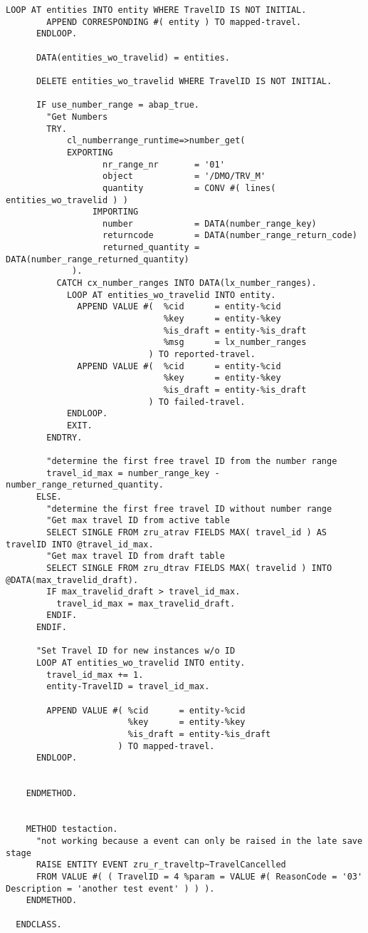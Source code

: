 \begin{Verbatim}[breaklines=true]
      LOOP AT entities INTO entity WHERE TravelID IS NOT INITIAL.
        APPEND CORRESPONDING #( entity ) TO mapped-travel.
      ENDLOOP.
  
      DATA(entities_wo_travelid) = entities.
  
      DELETE entities_wo_travelid WHERE TravelID IS NOT INITIAL.
  
      IF use_number_range = abap_true.
        "Get Numbers
        TRY.
            cl_numberrange_runtime=>number_get(
            EXPORTING
                   nr_range_nr       = '01'
                   object            = '/DMO/TRV_M'
                   quantity          = CONV #( lines( entities_wo_travelid ) )
                 IMPORTING
                   number            = DATA(number_range_key)
                   returncode        = DATA(number_range_return_code)
                   returned_quantity = DATA(number_range_returned_quantity)
             ).
          CATCH cx_number_ranges INTO DATA(lx_number_ranges).
            LOOP AT entities_wo_travelid INTO entity.
              APPEND VALUE #(  %cid      = entity-%cid
                               %key      = entity-%key
                               %is_draft = entity-%is_draft
                               %msg      = lx_number_ranges
                            ) TO reported-travel.
              APPEND VALUE #(  %cid      = entity-%cid
                               %key      = entity-%key
                               %is_draft = entity-%is_draft
                            ) TO failed-travel.
            ENDLOOP.
            EXIT.
        ENDTRY.
  
        "determine the first free travel ID from the number range
        travel_id_max = number_range_key - number_range_returned_quantity.
      ELSE.
        "determine the first free travel ID without number range
        "Get max travel ID from active table
        SELECT SINGLE FROM zru_atrav FIELDS MAX( travel_id ) AS travelID INTO @travel_id_max.
        "Get max travel ID from draft table
        SELECT SINGLE FROM zru_dtrav FIELDS MAX( travelid ) INTO @DATA(max_travelid_draft).
        IF max_travelid_draft > travel_id_max.
          travel_id_max = max_travelid_draft.
        ENDIF.
      ENDIF.
  
      "Set Travel ID for new instances w/o ID
      LOOP AT entities_wo_travelid INTO entity.
        travel_id_max += 1.
        entity-TravelID = travel_id_max.
  
        APPEND VALUE #( %cid      = entity-%cid
                        %key      = entity-%key
                        %is_draft = entity-%is_draft
                      ) TO mapped-travel.
      ENDLOOP.
  
  
    ENDMETHOD.
  
  
    METHOD testaction.
      "not working because a event can only be raised in the late save stage
      RAISE ENTITY EVENT zru_r_traveltp~TravelCancelled
      FROM VALUE #( ( TravelID = 4 %param = VALUE #( ReasonCode = '03' Description = 'another test event' ) ) ).
    ENDMETHOD.
  
  ENDCLASS.
  
\end{Verbatim}
